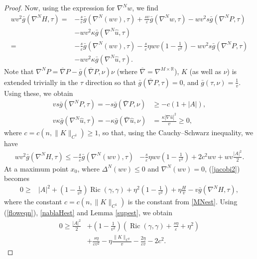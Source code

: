 \documentclass[11pt]{amsart}
\renewcommand{\epsilon}{\varepsilon}
\DeclareMathOperator{\Ric}{Ric}    \DeclareMathOperator{\Rm}{Rm}
\def\R{\mathbb{R}}
\def\e{\epsilon}
\def\ov{\overline}
\begin{document}
\begin{proof}
Now, using the expression for $\nabla^N w$,  we find 
\begin{align*}
wv^2\bar g(\nabla^N H,\tau)=&-\frac{s}{\varepsilon}\bar g(\nabla^N (wv),\tau)+\frac{sv}{\varepsilon}\bar g(\nabla^N w,\tau)-wv^2s\bar g(\nabla^N P,\tau)\\
&-wv^2\kappa \bar g(\nabla^N \hat u,\tau)\\
=&-\frac{s}{\varepsilon}\bar g(\nabla^N (wv),\tau)-\frac{s}{\varepsilon}\eta wv\left(1-\tfrac{1}{v^2}\right)-wv^2s\bar g(\nabla^N P,\tau)\\
&-wv^2\kappa \bar g(\nabla^N  \hat u,\tau).
\end{align*}
Note that $\nabla^NP=\ov\nabla P-\bar g(\ov\nabla P,\nu)\nu$ (where $\ov\nabla=\nabla^{M\times\R}$),  $K$ (as well as $\nu$)  is extended trivially in the $\tau$ direction so that $\bar g(\ov\nabla P,\tau)=0$, and $\bar g(\tau,\nu)=\frac{1}{v}$. Using these, we obtain
\begin{equation}\label{MNest}
\begin{split}
vs\bar g(\nabla^N P,\tau)=-s\bar g(\ov\nabla P,\nu)&\geq-c(1+|A|),\\
v\kappa \bar g(\nabla^N  \hat{u},\tau)=-\kappa \bar g(\ov\nabla \hat{u},\nu)&=\frac{\kappa|\nabla \hat{u}|^2}{v}\geq0,
\end{split}
\end{equation}
where $c=c(n, \|K\|_{C^1})\ge1$, so that, using the Cauchy--Schwarz inequality, we have
\begin{equation}\label{nablaHest}
\begin{split}
wv^2\bar g(\nabla^N H,\tau)\leq-\frac{s}{\varepsilon}\bar g(\nabla^N (wv),\tau)&-\frac{s}{\varepsilon}\eta wv\left(1-\frac{1}{v^2}\right)+2c^2wv+ wv\frac{|A|^2}{2}.
\end{split}
\end{equation}
At a maximum point $x_0$, where $\Delta^N(wv)\leq0$ and $\nabla^N(wv)=0$, (\ref{jacobi2}) becomes
\begin{align*}
0\geq&|A|^2 +\left(1-\frac{1}{v^2}\right)\Ric(\gamma,\gamma)+\eta^2\left(1-\frac{1}{v^2}\right)+\eta\frac{H}{v}-v\bar g(\nabla^N H,\tau),
\end{align*}
where the constant $c=c(n, \|K\|_{C^1})$ is the constant from \eqref{MNest}. Using (\ref{floweqn}),  \eqref{nablaHest} and Lemma \ref{supest}, we obtain
\[
\begin{split}
0\geq \frac{|A|^2}{2}&+\left(1-\frac{1}{v^2}\right)\left(\Ric(\gamma,\gamma)
+\frac{s\eta}{\varepsilon}+\eta^2\right)\\
&+\frac{s\eta}{\varepsilon v^2}-\eta\frac{\|K\|_{C^0}}{v}-\frac{2\eta}{\e v}-2c^2.

\end{split}\]
\end{proof}
\end{document}

